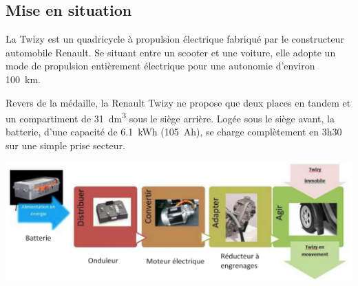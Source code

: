 \documentclass[10pt,fleqn]{article} %
\begin{document}

\vspace{4.5cm}
\pagestyle{fancy}
\thispagestyle{plain}

\def\columnseprulecolor{\color{ocre}}
\setlength{\columnseprule}{0.4pt} 

\def\pathfig{images}

\subsection*{Mise en situation}

La Twizy est un quadricycle à propulsion
électrique fabriqué par le constructeur automobile
Renault. %
Se situant entre
un scooter et une voiture, elle adopte un mode de
propulsion entièrement électrique pour une
autonomie d'environ \SI{100}{km}. 



Revers de la médaille, la Renault Twizy ne
propose que deux places en tandem et un compartiment de \SI{31}{dm^3} sous le siège arrière.
Logée sous le siège avant, la batterie, d'une capacité de \SI{6,1}{kWh} (\SI{105}{Ah}), se charge complètement en 3h30 sur une simple prise secteur.%




\begin{center}
\includegraphics[width=\linewidth]{images/ccmp_07_bis}
\end{center}
\end{document}
